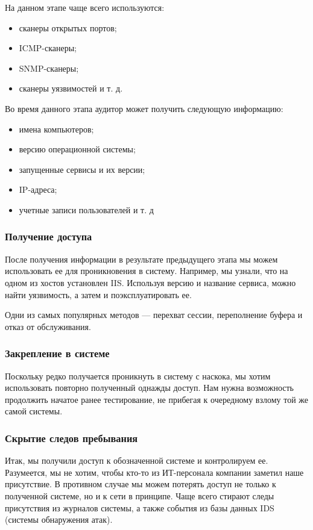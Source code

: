 На данном этапе чаще всего используются:
\begin{itemize}
	\item сканеры открытых портов;
	\item ICMP-сканеры;
	\item SNMP-сканеры;
	\item сканеры уязвимостей и т. д.
\end{itemize}

Во время данного этапа аудитор может получить следующую информацию:
\begin{itemize}
	\item имена компьютеров;
	\item версию операционной системы;
	\item запущенные сервисы и их версии;
	\item IP-адреса;
	\item учетные записи пользователей и т. д
\end{itemize}

\subsubsection{Получение доступа}

После получения информации в результате предыдущего этапа мы можем использовать ее для проникновения в систему. Например, мы узнали, что на одном из хостов установлен IIS. Используя версию и название сервиса, можно найти уязвимость, а затем и поэксплуатировать ее.

Одни из самых популярных методов — перехват сессии, переполнение буфера и отказ от обслуживания.

\subsubsection{Закрепление в системе}

Поскольку редко получается проникнуть в систему с наскока, мы хотим использовать повторно полученный однажды доступ. Нам нужна возможность продолжить начатое ранее тестирование, не прибегая к очередному взлому той же самой системы.

\subsubsection{Скрытие следов пребывания}

Итак, мы получили доступ к обозначенной системе и контролируем ее. Разумеется, мы не хотим, чтобы кто-то из ИТ-персонала компании заметил наше присутствие.
В противном случае мы можем потерять доступ не только к полученной системе, но и к сети в принципе.
Чаще всего стирают следы присутствия из журналов системы, а также события из базы данных IDS (системы обнаружения атак).

